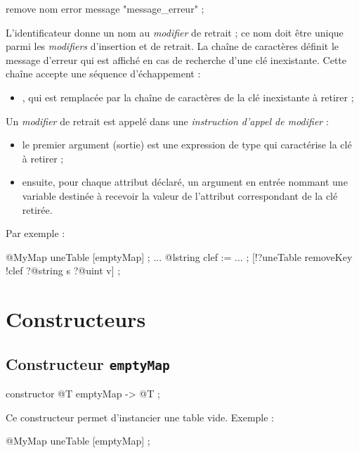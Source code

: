 \begin{galgascode}
remove nom error message "message_erreur" ;
\end{galgascode}

L'identificateur  donne un nom au \emph{modifier} de retrait ; ce nom doit être unique parmi les \emph{modifiers} d'insertion et de retrait. La chaîne de caractères  définit le message d'erreur qui est affiché en cas de recherche d'une clé inexistante. Cette chaîne accepte une séquence d'échappement :
\begin{itemize}
  \item {}, qui est remplacée par la chaîne de caractères de la clé inexistante à retirer ;
\end{itemize}


Un \emph{modifier} de retrait est appelé dans une \emph{instruction d'appel de modifier} :
\begin{itemize}
  \item le premier argument (sortie) est une expression de type  qui caractérise la clé à retirer ;
  \item ensuite, pour chaque attribut déclaré, un argument en entrée nommant une variable destinée à recevoir la valeur de l'attribut correspondant de la clé retirée.
\end{itemize}

Par exemple :
\begin{galgascode}
@MyMap uneTable [emptyMap] ;
...
@lstring clef := ... ;
[!?uneTable removeKey !clef ?@string s ?@uint v] ;
\end{galgascode}






\section{Constructeurs}

\subsection{Constructeur \texttt{emptyMap}}

\begin{galgascode}
constructor @T emptyMap -> @T ;
\end{galgascode}

Ce constructeur permet d'instancier une table vide. Exemple :
\begin{galgascode}
@MyMap uneTable [emptyMap] ;
\end{galgascode}

